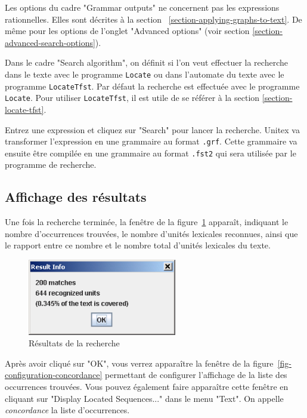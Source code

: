 \bigskip
\noindent Les options du cadre "Grammar outputs" ne concernent pas les expressions rationnelles.
Elles sont décrites à la section
~\ref{section-applying-graphs-to-text}. De même pour les options de l'onglet
"Advanced options" (voir section \ref{section-advanced-search-options}).

\bigskip
\noindent Dans le cadre "Search algorithm", on définit si l'on veut effectuer la recherche dans le
texte avec le programme \verb+Locate+ ou dans l'automate du texte avec le programme \verb+LocateTfst+.
Par défaut la recherche est effectuée avec le programme \verb+Locate+. Pour utiliser
\verb+LocateTfst+, il est utile de se référer à la section \ref{section-locate-tfst}.

\bigskip
\noindent Entrez une expression et cliquez sur "Search" pour lancer la recherche. Unitex va transformer
l’expression en une grammaire au format \verb+.grf+.
 Cette grammaire va ensuite être compilée en une grammaire au format
\verb+.fst2+ qui sera utilisée par le programme de recherche.


\subsection{Affichage des résultats}
\label{section-display-occurrences}
Une fois la recherche terminée, la fenêtre de la figure~\ref{fig-search-results}
apparaît, indiquant le nombre d’occurrences trouvées, le nombre d’unités lexicales reconnues,
ainsi que le rapport entre ce nombre et le nombre total d’unités lexicales du texte.

\bigskip
\begin{figure}[!ht]
\begin{center}
\includegraphics[width=6.5cm]{resources/img/fig4-5.png}
\caption{Résultats de la recherche \label{fig-search-results}}
\end{center}
\end{figure}

\noindent Après avoir cliqué sur "OK", vous verrez apparaître la fenêtre de la
figure~\ref{fig-configuration-concordance} permettant de configurer l’affichage de la liste
des occurrences trouvées. Vous pouvez également faire apparaître cette fenêtre en cliquant sur
"Display Located Sequences..." dans le menu "Text".
On appelle \textit{concordance} la liste d’occurrences.


